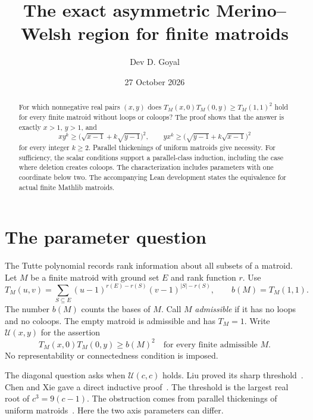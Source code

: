\documentclass[11pt,a4paper]{article}
\title{The exact asymmetric Merino--Welsh region for finite matroids}
\author{Dev D. Goyal}
\date{27 October 2026}
\newcommand{\U}{\mathcal U}
\begin{document}
\maketitle

\par{}
\begin{abstract}
For which nonnegative real pairs $(x,y)$ does
$T_M(x,0)T_M(0,y)\geq T_M(1,1)^2$ hold for every finite matroid without
loops or coloops? The proof shows that the answer is exactly $x>1$, $y>1$, and
\[
xy^k\geq\bigl(\sqrt{x-1}+k\sqrt{y-1}\bigr)^2,
\qquad
yx^k\geq\bigl(\sqrt{y-1}+k\sqrt{x-1}\bigr)^2
\]
for every integer $k\geq2$. Parallel thickenings of uniform matroids give
necessity. For sufficiency, the scalar conditions support a
parallel-class induction, including the case where deletion creates coloops.
The characterization includes parameters with one coordinate below two.
The accompanying Lean development states the equivalence for actual finite
Mathlib matroids.
\end{abstract}

\section{The parameter question}

The Tutte polynomial records rank information about all subsets of a matroid.
Let $M$ be a finite matroid with ground set $E$ and rank function $r$. Use
\[
T_M(u,v)=\sum_{S\subseteq E}(u-1)^{r(E)-r(S)}(v-1)^{|S|-r(S)},
\qquad b(M)=T_M(1,1).
\]
The number $b(M)$ counts the bases of $M$. Call $M$ \emph{admissible} if it
has no loops and no coloops. The empty matroid is admissible and has
$T_M=1$. Write $\U(x,y)$ for the assertion
\begin{equation}\label{eq:universal}
T_M(x,0)T_M(0,y)\geq b(M)^2
\quad\text{for every finite admissible }M.
\end{equation}
No representability or connectedness condition is imposed.

The diagonal question asks when $\U(c,c)$ holds. Liu proved its sharp
threshold~\cite{Liu}. Chen and Xie gave a direct inductive proof~\cite{CX}.
The threshold is the largest real root of $c^3=9(c-1)$. The obstruction
comes from parallel thickenings of uniform matroids~\cite{BCCP}.
Here the two axis parameters can differ.
\end{document}
